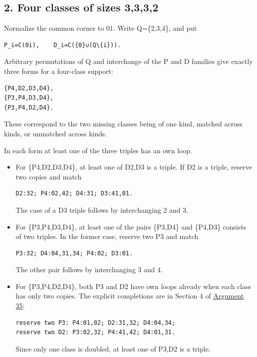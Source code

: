 \documentclass[
  10pt,
]{article}
\begin{document}
\hypertarget{four-classes-of-sizes-3332}{%
\subsection*{2. Four classes of sizes
3,3,3,2}\label{four-classes-of-sizes-3332}}

Normalize the common corner to 01. Write Q=\{2,3,4\}, and put

\begin{verbatim}
P_i=C(0i),    D_i=C({0}∪(Q\{i})).
\end{verbatim}

Arbitrary permutations of Q and interchange of the P and D families give
exactly three forms for a four-class support:

\begin{verbatim}
{P4,D2,D3,D4},
{P3,P4,D3,D4},
{P3,P4,D2,D4}.
\end{verbatim}

These correspond to the two missing classes being of one kind, matched
across kinds, or unmatched across kinds.

In each form at least one of the three triples has an own loop.

\begin{itemize}
\item
  For \{P4,D2,D3,D4\}, at least one of D2,D3 is a triple. If D2 is a
  triple, reserve two copies and match

\begin{verbatim}
D2:32; P4:02,42; D4:31; D3:41,01.
\end{verbatim}

  The case of a D3 triple follows by interchanging 2 and 3.
\item
  For \{P3,P4,D3,D4\}, at least one of the pairs \{P3,D4\} and \{P4,D3\}
  consists of two triples. In the former case, reserve two P3 and match

\begin{verbatim}
P3:32; D4:04,31,34; P4:02; D3:01.
\end{verbatim}

  The other pair follows by interchanging 3 and 4.
\item
  For \{P3,P4,D2,D4\}, both P3 and D2 have own loops already when each
  class has only two copies. The explicit completions are in Section 4
  of \protect\hyperlink{arg-35}{Argument 35}:

\begin{verbatim}
reserve two P3: P4:01,02; D2:31,32; D4:04,34;
reserve two D2: P3:02,32; P4:41,42; D4:01,31.
\end{verbatim}

  Since only one class is doubled, at least one of P3,D2 is a triple.
\end{itemize}
\end{document}
